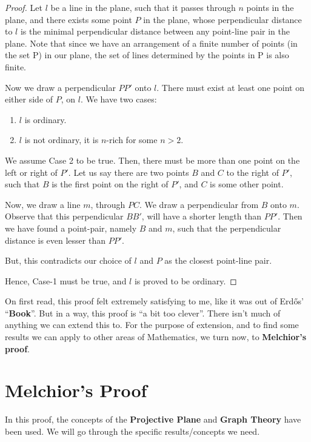 \documentclass{article}
\begin{document}
\begin{proof}
        Let $l$ be a line in the plane, such that it passes through $n$ points in the plane, and there exists some point $P$ in the plane, whose perpendicular distance to $l$ is the minimal perpendicular distance between any point-line pair in the plane. Note that since we have an arrangement of a finite number of points (in the set P) in our plane, the set of lines determined by the points in P is also finite.\newline
        
    \noindent Now we draw a perpendicular $PP'$ onto $l$. There must exist at least one point on either side of $P$, on $l$. We have two cases:
    \begin{enumerate}
        \item {$l$ is ordinary.}
        \item $l$ is not ordinary, it is $n$-rich for some $n > 2.$
    \end{enumerate}
    We assume Case 2 to be true.
    Then, there must be more than one point on the left or right of $P'$. Let us say there are two points $B$ and $C$ to the right of $P'$, such that $B$ is the first point on the right of $P'$, and $C$ is some other point.\newline

    \noindent Now, we draw a line $m$, through $PC$. We draw a perpendicular from $B$ onto $m$. Observe that this perpendicular $BB'$, will have a shorter length than $PP'$.\newline
    Then we have found a point-pair, namely $B$ and $m$, such that the perpendicular distance is even lesser than $PP'$. \newline

    \noindent But, this contradicts our choice of $l$ and $P$ as the closest point-line pair.

    \noindent Hence, Case-1 must be true, and $l$ is proved to be ordinary.
\end{proof}

\text{ }\newline
On first read, this proof felt extremely satisfying to me, like it was out of Erdős' \enquote{\textbf{Book}}. But in a way, this proof is \enquote{a bit too clever}. There isn't much of anything we can extend this to.\newline
For the purpose of extension, and to find some results we can apply to other areas of Mathematics, we turn now, to \textbf{Melchior's proof}.
\section{Melchior's Proof}
In this proof, the concepts of the \textbf{Projective Plane} and \textbf{Graph Theory} have been used. We will go through the specific results/concepts we need.
\end{document}
